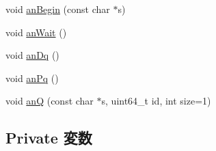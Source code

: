 \begin{DoxyCompactItemize}
void \hyperlink{classCopyEngine_1_1CopyEngineChannel_a8000b4835a66b0ff75fa7f5512f727a2}{anBegin} (const char $\ast$s)
\item 
void \hyperlink{classCopyEngine_1_1CopyEngineChannel_a34885371096072728525cff5eaae0c8c}{anWait} ()
\item 
void \hyperlink{classCopyEngine_1_1CopyEngineChannel_a6d48da71893149c635dac1dfb9db7cc9}{anDq} ()
\item 
void \hyperlink{classCopyEngine_1_1CopyEngineChannel_a404a8353a35bc56b38afd5a5f6733bee}{anPq} ()
\item 
void \hyperlink{classCopyEngine_1_1CopyEngineChannel_aa754a1b36810cef759e3c709a3d941e3}{anQ} (const char $\ast$s, uint64\_\-t id, int size=1)
\end{DoxyCompactItemize}
\subsection*{Private 変数}
